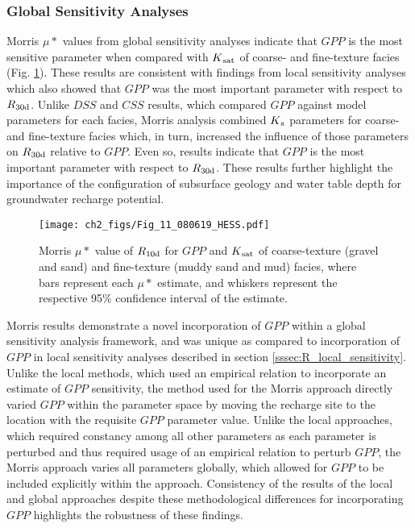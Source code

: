 \subsubsection{Global Sensitivity Analyses} \label{sssec:R_global_sensitivity}

Morris $\mu*$ values from global sensitivity analyses indicate that $GPP$ is the most sensitive parameter when compared with $K\textsubscript{sat}$ of coarse- and fine-texture facies (Fig. \ref{fig:Morris}). These results are consistent with findings from local sensitivity analyses which also showed that $GPP$ was the most important parameter with respect to $R\textsubscript{30d}$. Unlike $DSS$ and $CSS$ results, which compared $GPP$ against model parameters for each facies, Morris analysis combined $K\textsubscript{s}$ parameters for coarse- and fine-texture facies which, in turn, increased the influence of those parameters on $R\textsubscript{30d}$ relative to $GPP$. Even so, results indicate that $GPP$ is the most important parameter with respect to $R\textsubscript{30d}$. These results further highlight the importance of the configuration of subsurface geology and water table depth for groundwater recharge potential.

\begin{figure}[t]
\centering
\texttt{[image: ch2\_figs/Fig\_11\_080619\_HESS.pdf]}
\caption{Morris $\mu*$ value of $R\textsubscript{10d}$ for $GPP$ and $K\textsubscript{sat}$ of coarse-texture (gravel and sand) and fine-texture (muddy sand and mud) facies, where bars represent each $\mu*$ estimate, and whiskers represent the respective 95\% confidence interval of the estimate.}
\label{fig:Morris}
\end{figure}

Morris results demonstrate a novel incorporation of $GPP$ within a global sensitivity analysis framework, and was unique as compared to incorporation of $GPP$ in local sensitivity analyses described in section \ref{sssec:R_local_sensitivity}. Unlike the local methods, which used an empirical relation to incorporate an estimate of $GPP$ sensitivity, the method used for the Morris approach directly varied $GPP$ within the parameter space by moving the recharge site to the location with the requisite $GPP$ parameter value. Unlike the local approaches, which required constancy among all other parameters as each parameter is perturbed and thus required usage of an empirical relation to perturb $GPP$, the Morris approach varies all parameters globally, which allowed for $GPP$ to be included explicitly within the approach. Consistency of the results of the local and global approaches despite these methodological differences for incorporating $GPP$ highlights the robustness of these findings. 

